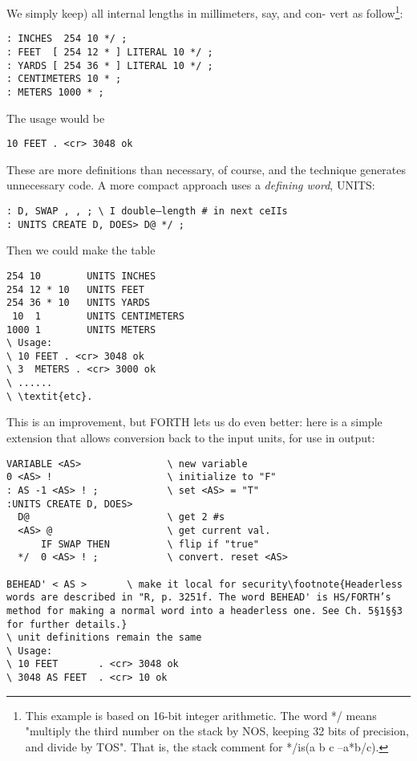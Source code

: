 We simply keep) all internal lengths in millimeters, say, and con-
vert as follow\footnote{This example is based on 16-bit integer arithmetic. The word */ means "multiply the third number on the stack by NOS, keeping 32 bits of precision, and divide by TOS". That is, the stack comment for */is(a b c --a*b/c).}:

\begin{verbatim}
: INCHES  254 10 */ ;
: FEET  [ 254 12 * ] LITERAL 10 */ ;
: YARDS [ 254 36 * ] LITERAL 10 */ ;
: CENTIMETERS 10 * ;
: METERS 1000 * ;
\end{verbatim}

The usage would be
\begin{verbatim}
10 FEET . <cr> 3048 ok
\end{verbatim}

These are more definitions than necessary, of course, and the technique generates unnecessary code. A more compact approach uses a \textit{defining word}, UNITS:

\begin{verbatim}
: D, SWAP , , ; \ I double—length # in next ceIIs
: UNITS CREATE D, DOES> D@ */ ;
\end{verbatim}

Then we could make the table
\begin{verbatim}
254 10        UNITS INCHES
254 12 * 10   UNITS FEET
254 36 * 10   UNITS YARDS
 10  1        UNITS CENTIMETERS
1000 1        UNITS METERS
\ Usage:
\ 10 FEET . <cr> 3048 ok
\ 3  METERS . <cr> 3000 ok
\ ......
\ \textit{etc}.
\end{verbatim}

This is an improvement, but FORTH lets us do even better: here is a simple extension that allows conversion back to the input units, for use in output:

\begin{verbatim}
VARIABLE <AS>               \ new variable
0 <AS> !                    \ initialize to "F"
: AS -1 <AS> ! ;            \ set <AS> = "T"
:UNITS CREATE D, DOES>
  D@                        \ get 2 #s
  <AS> @                    \ get current val.
      IF SWAP THEN          \ flip if "true"
  */  0 <AS> ! ;            \ convert. reset <AS>

BEHEAD' < AS >       \ make it local for security\footnote{Headerless words are described in "R, p. 3251f. The word BEHEAD' is HS/FORTH’s method for making a normal word into a headerless one. See Ch. 5§1§§3 for further details.}
\ unit definitions remain the same
\ Usage:
\ 10 FEET       . <cr> 3048 ok
\ 3048 AS FEET  . <cr> 10 ok
\end{verbatim}

